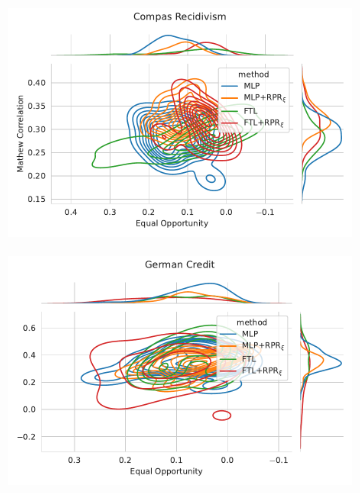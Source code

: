 \begin{figure}
\begin{subfigure}{.45\linewidth}
    \includegraphics[width=1\linewidth]{images/pareto_mcc_opportunity_compas_rpr.pdf}
\end{subfigure}
\begin{subfigure}{.45\linewidth}
    \includegraphics[width=1\linewidth]{images/pareto_mcc_opportunity_german_rpr.pdf}
\end{subfigure}
\end{figure}



